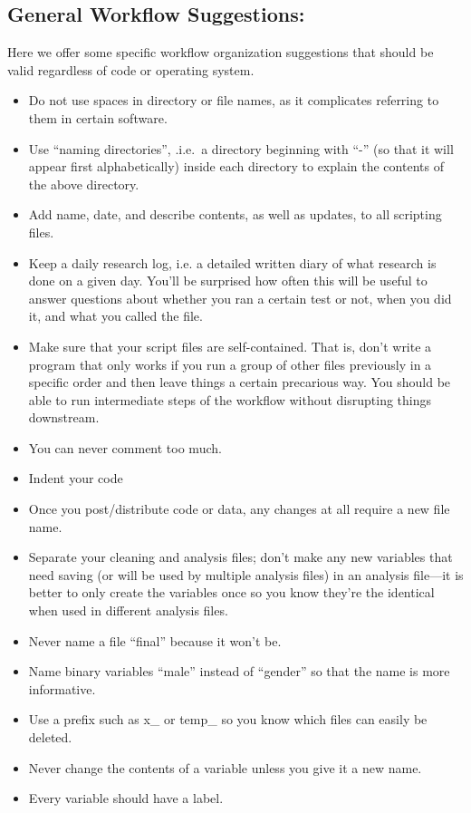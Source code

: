 \documentclass[12pt] {article}
\begin{document}
\subsection{General Workflow
Suggestions:}\label{general-workflow-suggestions}
Here we offer some specific workflow organization suggestions that should be valid regardless of code or operating system.
\begin{itemize}
\item
  Do not use spaces in directory or file names, as it complicates referring to them in certain software.
\item
  Use ``naming directories'', .i.e.~a directory beginning with ``-'' (so
  that it will appear first alphabetically) inside each directory to
  explain the contents of the above directory.
\item
  Add name, date, and describe contents, as well as updates, to all
  scripting files.
\item
  Keep a daily research log, i.e. a detailed written diary of what research is done on a given day. You'll be surprised how often this will be useful to answer questions about whether you ran a certain test or not, when you did it, and what you called the file.
  
\item
    Make sure that your script files are self-contained. That is, don't write a program that only works if you run a group of other files previously in a specific order and then leave things a certain precarious way. You should be able to run intermediate steps of the workflow without disrupting things downstream.
 
\item
  You can never comment too much.
\item
  Indent your code
\item
    Once you post/distribute code or data, any changes at all require a new file name.
\item
  Separate your cleaning and analysis files; don't make any new variables
  that need saving (or will be used by multiple analysis
  files) in an analysis file---it is better to only create the variables once so you know they're the identical when used in different analysis files.
\item
  Never name a file ``final'' because it won't be.
\item
  Name binary variables ``male'' instead of ``gender'' so that the name is more informative. 
\item
  Use a prefix such as x\_ or temp\_ so you know which files can easily
  be deleted.
\item
  Never change the contents of a variable unless you give it a new name.
\item
  Every variable should have a label.
\end{itemize}
\end{document}
